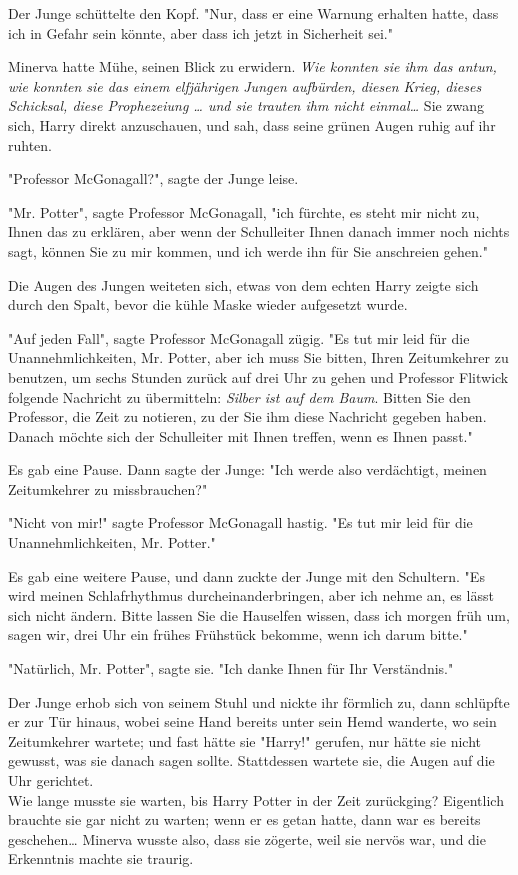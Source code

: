 {Der Junge schüttelte den Kopf. "Nur, dass er eine Warnung erhalten hatte, dass ich in Gefahr sein könnte, aber dass ich jetzt in Sicherheit sei."

Minerva hatte Mühe, seinen Blick zu erwidern. \emph{Wie konnten sie ihm das antun, wie konnten sie das einem elfjährigen Jungen aufbürden, diesen Krieg, dieses Schicksal, diese Prophezeiung … und sie trauten ihm nicht einmal…} Sie zwang sich, Harry direkt anzuschauen, und sah, dass seine grünen Augen ruhig auf ihr ruhten.

"Professor McGonagall?", sagte der Junge leise.

"Mr. Potter", sagte Professor McGonagall, "ich fürchte, es steht mir nicht zu, Ihnen das zu erklären, aber wenn der Schulleiter Ihnen danach immer noch nichts sagt, können Sie zu mir kommen, und ich werde ihn für Sie anschreien gehen."

Die Augen des Jungen weiteten sich, etwas von dem echten Harry zeigte sich durch den Spalt, bevor die kühle Maske wieder aufgesetzt wurde.

"Auf jeden Fall", sagte Professor McGonagall zügig. "Es tut mir leid für die Unannehmlichkeiten, Mr. Potter, aber ich muss Sie bitten, Ihren Zeitumkehrer zu benutzen, um sechs Stunden zurück auf drei Uhr zu gehen und Professor Flitwick folgende Nachricht zu übermitteln: \emph{Silber ist auf dem Baum}. Bitten Sie den Professor, die Zeit zu notieren, zu der Sie ihm diese Nachricht gegeben haben. Danach möchte sich der Schulleiter mit Ihnen treffen, wenn es Ihnen passt."

Es gab eine Pause. Dann sagte der Junge: "Ich werde also verdächtigt, meinen Zeitumkehrer zu missbrauchen?"

"Nicht von mir!" sagte Professor McGonagall hastig. "Es tut mir leid für die Unannehmlichkeiten, Mr. Potter."

Es gab eine weitere Pause, und dann zuckte der Junge mit den Schultern. "Es wird meinen Schlafrhythmus durcheinanderbringen, aber ich nehme an, es lässt sich nicht ändern. Bitte lassen Sie die Hauselfen wissen, dass ich morgen früh um, sagen wir, drei Uhr ein frühes Frühstück bekomme, wenn ich darum bitte."

"Natürlich, Mr. Potter", sagte sie. "Ich danke Ihnen für Ihr Verständnis."

Der Junge erhob sich von seinem Stuhl und nickte ihr förmlich zu, dann schlüpfte er zur Tür hinaus, wobei seine Hand bereits unter sein Hemd wanderte, wo sein Zeitumkehrer wartete; und fast hätte sie "Harry!" gerufen, nur hätte sie nicht gewusst, was sie danach sagen sollte. Stattdessen wartete sie, die Augen auf die Uhr gerichtet.\\ Wie lange musste sie warten, bis Harry Potter in der Zeit zurückging? Eigentlich brauchte sie gar nicht zu warten; wenn er es getan hatte, dann war es bereits geschehen… Minerva wusste also, dass sie zögerte, weil sie nervös war, und die Erkenntnis machte sie traurig.

}
